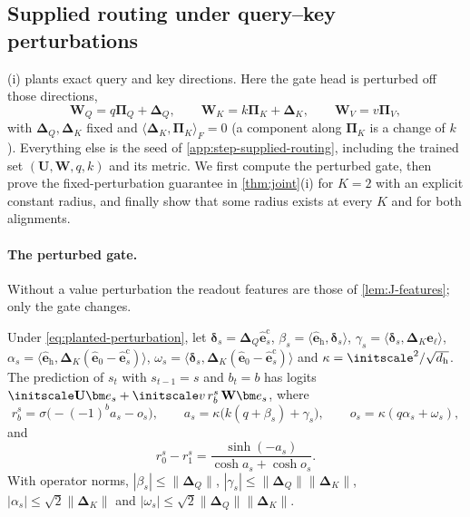 \subsection{Supplied routing under query--key perturbations}
\label{app:perturbed-routing}

(i) plants exact query and key directions. Here the gate head is perturbed off those directions,
\begin{equation}
 \mathbf W_Q=q\bm\Pi_Q+\bm\Delta_Q,\qquad \mathbf W_K=k\bm\Pi_K+\bm\Delta_K,\qquad \mathbf W_V=v\bm\Pi_V,
 \label{eq:planted-perturbation}
\end{equation}
with $\bm\Delta_Q,\bm\Delta_K$ fixed and $\langle\bm\Delta_K,\bm\Pi_K\rangle_F=0$ (a component along $\bm\Pi_K$ is a change of $k$).
Everything else is the seed of \cref{app:step-supplied-routing}, including the trained set $(\mathbf U,\mathbf W,q,k)$ and its metric.
We first compute the perturbed gate, then prove the fixed-perturbation guarantee in \cref{thm:joint}(i) for $K=2$ with an explicit constant radius, and finally
show that some radius exists at every $K$ and for both alignments.

\paragraph{The perturbed gate.} Without a value perturbation the readout features are those of \cref{lem:J-features};
only the gate changes.

\begin{lemma}
\label{lem:perturbed-gate}
Under \cref{eq:planted-perturbation}, let $\bm\delta_s=\bm\Delta_Q\hat{\bm e}^{\mathrm c}_s$, $\beta_s=\langle\hat{\bm e}_{\mathrm h},\bm\delta_s\rangle$,
$\gamma_s=\langle\bm\delta_s,\bm\Delta_K\hat{\bm e}_\ell\rangle$, $\alpha_s=\langle\hat{\bm e}_{\mathrm h},\bm\Delta_K(\hat{\bm e}_0-\hat{\bm e}^{\mathrm c}_s)\rangle$,
$\omega_s=\langle\bm\delta_s,\bm\Delta_K(\hat{\bm e}_0-\hat{\bm e}^{\mathrm c}_s)\rangle$ and $\kappa=\initscale^2/\sqrt{d_{\mathrm h}}$. The prediction of $s_t$ with
$s_{t-1}=s$ and $b_t=b$ has logits $\initscale\mathbf U\bm e_s+\initscale v\,r^s_b\,\mathbf W\bm e_s$, where
\begin{equation}
 r^s_b=\sigma\bigl(-(-1)^ba_s-o_s\bigr),\qquad a_s=\kappa\bigl(k(q+\beta_s)+\gamma_s\bigr),\qquad o_s=\kappa(q\alpha_s+\omega_s),
 \label{eq:perturbed-gate}
\end{equation}
and
\begin{equation}
 r^s_0-r^s_1=\frac{\sinh(-a_s)}{\cosh a_s+\cosh o_s}.
 \label{eq:perturbed-contrast}
\end{equation}
With operator norms, $|\beta_s|\le\|\bm\Delta_Q\|$, $|\gamma_s|\le\|\bm\Delta_Q\|\|\bm\Delta_K\|$, $|\alpha_s|\le\sqrt2\|\bm\Delta_K\|$ and
$|\omega_s|\le\sqrt2\|\bm\Delta_Q\|\|\bm\Delta_K\|$.
\end{lemma}

